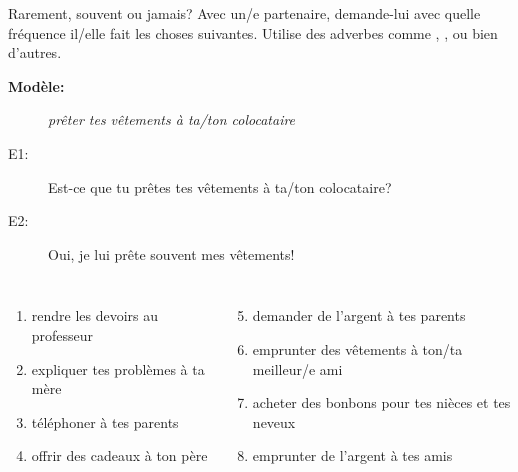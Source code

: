 \documentclass{beamer}
\begin{document}
  \begin{frame}{Rarement, souvent ou jamais?}
    Avec un/e partenaire, demande-lui avec quelle fréquence il/elle fait les choses suivantes.
    Utilise des adverbes comme , ,  ou bien d'autres.
    \begin{description}
      \item[\textbf{Modèle:}] \emph{prêter tes vêtements à ta/ton colocataire}
      \item[E1:] Est-ce que tu prêtes tes vêtements à ta/ton colocataire?
      \item[E2:] Oui, je lui prête souvent mes vêtements!
    \end{description}
    \begin{columns}[t]
        \begin{enumerate}
          \item rendre les devoirs au professeur
          \item expliquer tes problèmes à ta mère
          \item téléphoner à tes parents
          \item offrir des cadeaux à ton père
        \end{enumerate}
        \begin{enumerate}
          \setcounter{enumi}{4}
          \item demander de l'argent à tes parents
          \item emprunter des vêtements à ton/ta meilleur/e ami
          \item acheter des bonbons pour tes nièces et tes neveux
          \item emprunter de l'argent à tes amis
        \end{enumerate}
    \end{columns}
  \end{frame}
\end{document}
